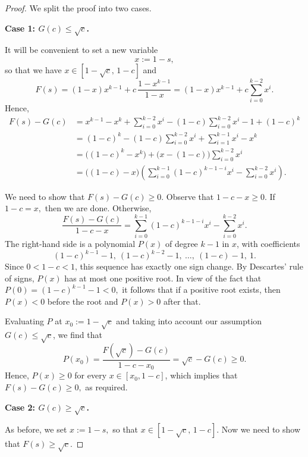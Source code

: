 \documentclass[10pt,a4paper]{amsart}
\begin{document}
\begin{proof}
We split the proof into two cases.

\medskip
\noindent\textbf{Case 1: $G(c)\le \sqrt c$.}
\smallskip

It will be convenient to set a new variable
\[
x:=1-s,
\]
so that we have $x\in[1-\sqrt c,\,1-c]$ and
\[
F(s)=(1-x)x^{k-1}+c\,\frac{1-x^{k-1}}{1-x}=(1-x)x^{k-1}+c\sum_{i=0}^{k-2}x^i.
\]
Hence,
\begin{align*}
F(s)-G(c)
&=x^{k-1}-x^k+\sum_{i=0}^{k-2}x^i-(1-c)\sum_{i=0}^{k-2}x^i-1+(1-c)^k \\
&=(1-c)^k-(1-c)\sum_{i=0}^{k-2}x^i+\sum_{i=1}^{k-1}x^i-x^k \\
&=\bigl((1-c)^k-x^k\bigr)+\bigl(x-(1-c)\bigr)\sum_{i=0}^{k-2}x^i \\
&=\bigl((1-c)-x\bigr)\left(\sum_{i=0}^{k-1}(1-c)^{k-1-i}x^i-\sum_{i=0}^{k-2}x^i\right).
\end{align*}

We need to show that $F(s)-G(c)\ge 0$. Observe that $1-c-x\ge0.$ If $1-c=x,$ then we are done. Otherwise,
\[
\frac{F(s)-G(c)}{1-c-x}=\sum_{i=0}^{k-1}(1-c)^{k-1-i}x^i-\sum_{i=0}^{k-2}x^i.
\]
The right-hand side is a polynomial $P(x)$ of degree $k-1$ in $x$, with coefficients
\[
(1-c)^{k-1}-1,\ (1-c)^{k-2}-1,\ \dots,\ (1-c)-1,\ 1.
\]
Since $0<1-c<1$, this sequence has exactly one sign change. By Descartes' rule of signs, $P(x)$ has at most one positive root.
In view of the fact that $P(0)=(1-c)^{k-1}-1<0,$ it follows that if a positive root exists, then $P(x)<0$ before the root and $P(x)>0$ after that.


Evaluating $P$ at $x_0:=1-\sqrt c$ and taking into account our assumption $G(c)\le \sqrt c$,  we find that
\[
P(x_0)=\frac{F(\sqrt c)-G(c)}{1-c-x_0}=\sqrt{c}-G(c)\ge 0.
\]
Hence, $P(x)\ge 0$ for every $x\in[x_0,1-c]$, which implies that
$F(s)-G(c)\ge 0,$ as required.

\medskip
\noindent\textbf{Case 2: $G(c)\ge \sqrt c$.}
\smallskip

As before, we set $x:=1-s,$ so that $x\in[1-\sqrt{c},\,1-c]$. Now we need to show that $F(s)\ge\sqrt c$.


\end{proof}
\end{document}
